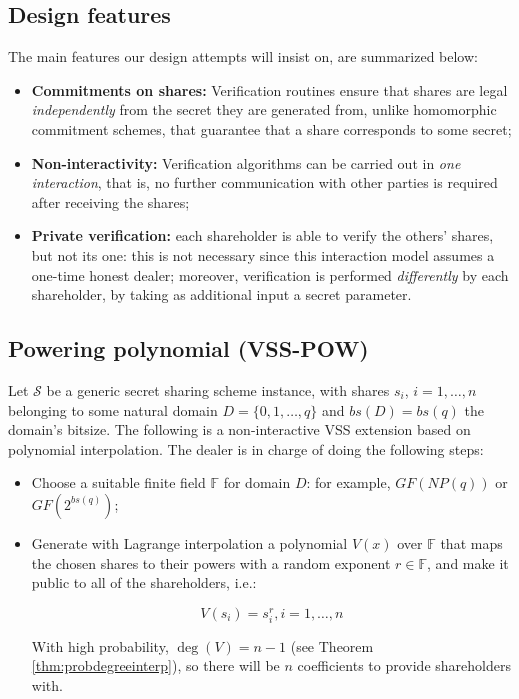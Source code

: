 \documentclass[10pt,journal,cspaper,compsoc]{IEEEtran}
\begin{document}
\subsection{Design features}
The main features our design attempts will insist on, are summarized below:
\begin{itemize}
\item \textbf{Commitments on shares:} Verification routines ensure that shares are legal \emph{independently} from the secret they are generated from, unlike homomorphic commitment schemes, that guarantee that a share corresponds to some secret;
\item \textbf{Non-interactivity:} Verification algorithms can be carried out in \emph{one interaction}, that is, no further communication with other parties is required after receiving the shares;
\item \textbf{Private verification:} each shareholder is able to verify the others' shares, but not its one: this is not necessary since this interaction model assumes a one-time honest dealer; moreover, verification is performed \emph{differently} by each shareholder, by taking as additional input a secret parameter.
\end{itemize}


\subsection{Powering polynomial (VSS-POW)}
Let $\mathcal{S}$ be a generic secret sharing scheme instance, with shares $s_i$, $i=1,\ldots,n$ belonging to some natural domain $D = \{0,1,\ldots,q\}$ and $bs(D)=bs(q)$ the domain's bitsize. The following is a non-interactive VSS extension based on polynomial interpolation. The dealer is in charge of doing the following steps:

\begin{itemize}
\item Choose a suitable finite field $\mathbb{F}$ for domain $D$: for example, $GF(NP(q))$ or $GF(2^{bs(q)})$;
\item Generate with Lagrange interpolation a polynomial $V(x)$ over $\mathbb{F}$ that maps the chosen shares to their powers with a random exponent $r \in \mathbb{F}$, and make it public to all of the shareholders, i.e.:

\begin{equation}
\label{vss-pow-verification}
V(s_i) = s_i^r , i=1,\ldots,n
\end{equation}

With high probability, $\deg(V)=n-1$ (see Theorem \ref{thm:probdegreeinterp}), so there will be $n$ coefficients to provide shareholders with.
\end{itemize}
\end{document}
